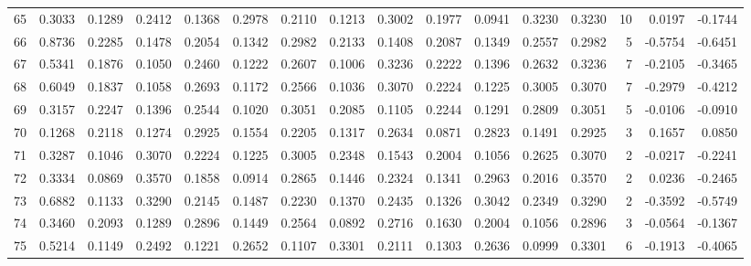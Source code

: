 \begin{tabular}{lrrrrrrrrrrrrrrr}
65  &      0.3033 &  0.1289 &  0.2412 &  0.1368 &  0.2978 &  0.2110 &  0.1213 &  0.3002 &  0.1977 &  0.0941 &   0.3230 &     0.3230 &     10 &                    0.0197 &                    -0.1744 \\
66  &      0.8736 &  0.2285 &  0.1478 &  0.2054 &  0.1342 &  0.2982 &  0.2133 &  0.1408 &  0.2087 &  0.1349 &   0.2557 &     0.2982 &      5 &                   -0.5754 &                    -0.6451 \\
67  &      0.5341 &  0.1876 &  0.1050 &  0.2460 &  0.1222 &  0.2607 &  0.1006 &  0.3236 &  0.2222 &  0.1396 &   0.2632 &     0.3236 &      7 &                   -0.2105 &                    -0.3465 \\
68  &      0.6049 &  0.1837 &  0.1058 &  0.2693 &  0.1172 &  0.2566 &  0.1036 &  0.3070 &  0.2224 &  0.1225 &   0.3005 &     0.3070 &      7 &                   -0.2979 &                    -0.4212 \\
69  &      0.3157 &  0.2247 &  0.1396 &  0.2544 &  0.1020 &  0.3051 &  0.2085 &  0.1105 &  0.2244 &  0.1291 &   0.2809 &     0.3051 &      5 &                   -0.0106 &                    -0.0910 \\
70  &      0.1268 &  0.2118 &  0.1274 &  0.2925 &  0.1554 &  0.2205 &  0.1317 &  0.2634 &  0.0871 &  0.2823 &   0.1491 &     0.2925 &      3 &                    0.1657 &                     0.0850 \\
71  &      0.3287 &  0.1046 &  0.3070 &  0.2224 &  0.1225 &  0.3005 &  0.2348 &  0.1543 &  0.2004 &  0.1056 &   0.2625 &     0.3070 &      2 &                   -0.0217 &                    -0.2241 \\
72  &      0.3334 &  0.0869 &  0.3570 &  0.1858 &  0.0914 &  0.2865 &  0.1446 &  0.2324 &  0.1341 &  0.2963 &   0.2016 &     0.3570 &      2 &                    0.0236 &                    -0.2465 \\
73  &      0.6882 &  0.1133 &  0.3290 &  0.2145 &  0.1487 &  0.2230 &  0.1370 &  0.2435 &  0.1326 &  0.3042 &   0.2349 &     0.3290 &      2 &                   -0.3592 &                    -0.5749 \\
74  &      0.3460 &  0.2093 &  0.1289 &  0.2896 &  0.1449 &  0.2564 &  0.0892 &  0.2716 &  0.1630 &  0.2004 &   0.1056 &     0.2896 &      3 &                   -0.0564 &                    -0.1367 \\
75  &      0.5214 &  0.1149 &  0.2492 &  0.1221 &  0.2652 &  0.1107 &  0.3301 &  0.2111 &  0.1303 &  0.2636 &   0.0999 &     0.3301 &      6 &                   -0.1913 &                    -0.4065 \\

\end{tabular}
